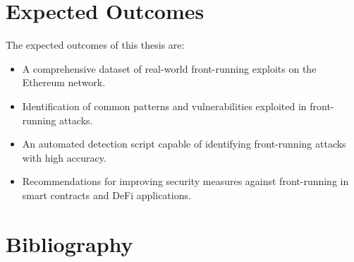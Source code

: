 \documentclass{scrartcl}
\begin{document}
\section*{Expected Outcomes}

The expected outcomes of this thesis are:

\begin{itemize}
    \item A comprehensive dataset of real-world front-running exploits on the Ethereum network.
    \item Identification of common patterns and vulnerabilities exploited in front-running attacks.
    \item An automated detection script capable of identifying front-running attacks with high accuracy.
    \item Recommendations for improving security measures against front-running in smart contracts and DeFi applications.
\end{itemize}

\section*{Bibliography}

\nocite{*}

\end{document}
